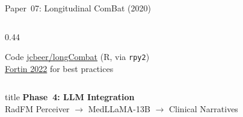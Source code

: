 \documentclass[aspectratio=169,xcolor=dvipsnames]{beamer}
\begin{document}
\begin{frame}{Paper~07: Longitudinal ComBat (2020)}
\begin{columns}
\begin{column}{0.44\textwidth}
            \vspace{0.2em}

            \begin{exampleblock}{\scriptsize {} Code}
                \scriptsize \href{https://github.com/jcbeer/longCombat}{jcbeer/longCombat} (R, via \texttt{rpy2})\\[0.1em]
                \href{https://doi.org/10.2967/jnumed.121.262464}{Fortin 2022} for best practices
            \end{exampleblock}
        \end{column}
    \end{columns}
\end{frame}

\begin{frame}[plain]
    \centering
    \vfill
    \begin{beamercolorbox}[center,shadow=true,rounded=true]{title}
        \textbf{Phase~4: LLM Integration}\\
        \vspace{0.5em}
        \large RadFM Perceiver $\to$ MedLLaMA-13B $\to$ Clinical Narratives
    \end{beamercolorbox}
    \vfill
\end{frame}
\end{document}
